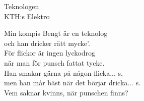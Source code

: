   {\Large Teknologen}\\{\tiny  KTH:s Elektro}
  \begin{vers}
Min kompis Bengt är en teknolog \\
och han dricker rätt mycke’. \\
För flickor är ingen lyckodrog \\
när man för punsch fattat tycke. \\
Han smakar gärna på någon flicka... s, \\
men han mår bäst när det börjar dricka... s. \\
Vem saknar kvinns, när punschen finns? \\
\end{vers}